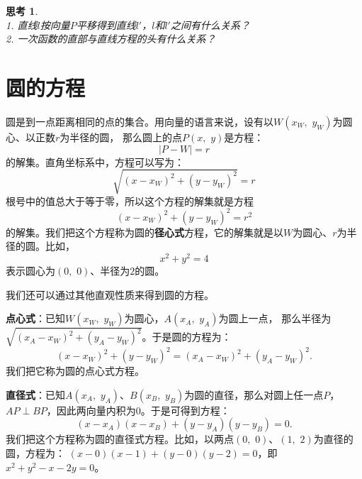\documentclass[12pt,UTF8]{ctexbook}
\newtheorem{sk}{思考}[section]
\begin{document}
\begin{sk}
    \mbox{}\\
    1. 直线$l$按向量$P$平移得到直线$l'$，$l$和$l'$之间有什么关系？ \\
    2. 一次函数的直部与直线方程的头有什么关系？
\end{sk}

\section{圆的方程}

圆是到一点距离相同的点的集合。用向量的语言来说，设有以$W(x_W,\,\, y_W)$为圆心、以正数$r$为半径的圆，
那么圆上的点$P(x, \,\,y)$是方程：
$$|P - W| = r$$
的解集。直角坐标系中，方程可以写为：
$$\sqrt{(x - x_W)^2 + (y - y_W)^2} = r$$
根号中的值总大于等于零，所以这个方程的解集就是方程
$$(x - x_W)^2 + (y - y_W)^2 = r^2$$
的解集。我们把这个方程称为圆的\textbf{径心式}方程，它的解集就是以$W$为圆心、$r$为半径的圆。比如，
$$x^2 + y^2 = 4$$
表示圆心为$(0,\,\,0)$、半径为$2$的圆。

我们还可以通过其他直观性质来得到圆的方程。

\textbf{点心式}：已知$W(x_W,\,\, y_W)$为圆心，$A(x_A,\,\,y_A)$为圆上一点，
那么半径为$\sqrt{(x_A - x_W)^2 + (y_A - y_W)^2}$。于是圆的方程为：
$$ (x - x_W)^2 + (y - y_W)^2 = (x_A - x_W)^2 + (y_A - y_W)^2.$$
我们把它称为圆的点心式方程。

\textbf{直径式}：已知$A(x_A,\,\,y_A)$、$B(x_B,\,\,y_B)$为圆的直径，那么对圆上任一点$P$，$AP\perp BP$，因此两向量内积为$0$。于是可得到方程：
$$ (x - x_A)(x - x_B) + (y - y_A)(y - y_B) = 0.$$
我们把这个方程称为圆的直径式方程。比如，以两点$(0,\,\,0)$、$(1,\,\,2)$为直径的圆，方程为：
$ (x - 0)(x - 1) + (y - 0)(y - 2) = 0$，即$x^2 + y^2 - x - 2y = 0$。
\end{document}
